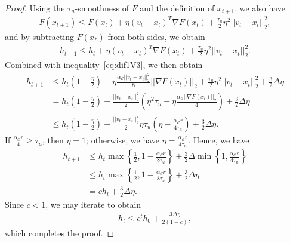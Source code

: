 \documentclass{article}
\begin{document}
\begin{proof}
Using the $\tau_u$-smoothness of $F$ and the definition of $x_{t + 1}$, we also have
\begin{align*}
F(x_{t + 1}) \leq F(x_t) + \eta(v _t - x_t)^T \nabla F(x_t) + \frac{\tau_u}{2}\eta^2||v_t - x_t||_2^2,
\end{align*}
and by subtracting $F(x_{*})$ from both sides, we obtain
\begin{align*}
h_{t + 1} \leq h_t + \eta(v _t - x_t)^T \nabla F(x_t) + \frac{\tau_u}{2}\eta^2||v_t - x_t||_2^2.
\end{align*}
Combined with inequality~\eqref{eq:dif1V3}, we then obtain
\begin{align*}
h_{t + 1} &\leq h_t\left(1 - \frac{\eta}{2}\right) -\eta\frac{\alpha_{\mathcal{C}}||v_t - x_t||_2^2}{8}||\nabla F(x_t)||_2 + \frac{\tau_u}{2}\eta^2||v_t - x_t||_2^2 + \frac{3}{2}\Delta\eta\\
&= h_t\left(1 - \frac{\eta}{2}\right) + \frac{||v_t - x_t||_2^2}{2}\left(\eta^2\tau_u - \eta\frac{\alpha_{\mathcal{C}}||\nabla F(x_t)||_2}{4}\right) + \frac{3}{2}\Delta\eta\\
&\leq h_t\left(1 - \frac{\eta}{2}\right) + \frac{||v_t - x_t||_2^2}{2}\eta\tau_u\left(\eta - \frac{\alpha_{\mathcal{C}} r}{4\tau_u}\right) + \frac{3}{2}\Delta\eta.
\end{align*}
If $\frac{\alpha_{\mathcal{C}} r}{4} \geq \tau_u$, then $\eta = 1$; otherwise, we have $\eta = \frac{\alpha_{\mathcal{C}} r}{4\tau_u}$. Hence, we have
\begin{align*}
h_{t + 1} & \leq h_t\max\left\{\frac{1}{2}, 1 - \frac{\alpha_{\mathcal{C}} r}{8\tau_u}\right\} + \frac{3}{2}\Delta\min\left\{1, \frac{\alpha_{\mathcal{C}} r}{4\tau_u}\right\} \\
%
&\leq h_t\max\left\{\frac{1}{2}, 1 - \frac{\alpha_{\mathcal{C}} r}{8\tau_u}\right\} + \frac{3}{2}\Delta \eta\\
&= ch_t + \frac{3}{2}\Delta \eta.
\end{align*}
Since $c < 1$, we may iterate to obtain
\begin{align*}
h_t \leq c^th_0 + \frac{3\Delta\eta}{2(1 - c)},
\end{align*}
which completes the proof.
\end{proof}
\end{document}
